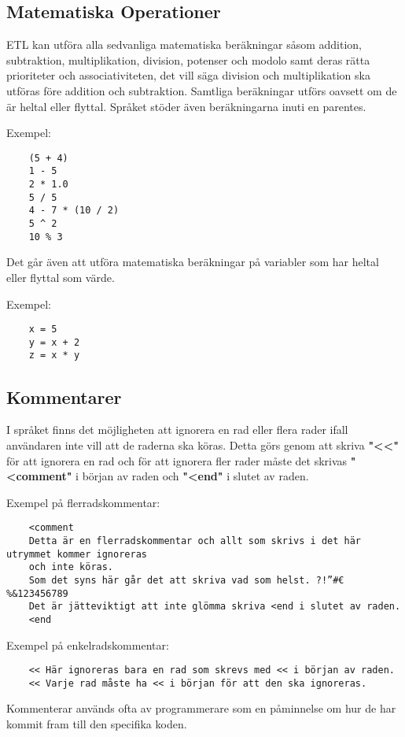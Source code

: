 \documentclass{TDP019mall}
\begin{document}
\subsection{Matematiska Operationer}
ETL kan utföra alla sedvanliga matematiska beräkningar såsom addition, subtraktion, multiplikation, division, potenser och modolo 
samt deras rätta prioriteter och associativiteten, det vill säga division och multiplikation ska utföras före addition och subtraktion. 
Samtliga beräkningar utförs oavsett om de är heltal eller flyttal. Språket stöder även beräkningarna inuti en parentes. 

Exempel:

\begin{verbatim}
    (5 + 4)
    1 - 5
    2 * 1.0
    5 / 5
    4 - 7 * (10 / 2)
    5 ^ 2
    10 % 3
\end{verbatim}

Det går även att utföra matematiska beräkningar på variabler som har heltal eller flyttal som värde. 

Exempel:
\begin{verbatim}
    x = 5
    y = x + 2
    z = x * y
\end{verbatim}

\subsection{Kommentarer}
I språket finns det möjligheten att ignorera en rad eller flera rader ifall användaren inte vill att de raderna ska köras. 
Detta görs genom att skriva \textbf{"<<"} för att ignorera en rad och för att ignorera fler rader måste det skrivas 
\textbf{"<comment"} i början av raden och \textbf{"<end"} i slutet av raden.

Exempel på flerradskommentar:
\begin{verbatim}
    <comment 
    Detta är en flerradskommentar och allt som skrivs i det här utrymmet kommer ignoreras 
    och inte köras. 
    Som det syns här går det att skriva vad som helst. ?!”#€%&123456789
    Det är jätteviktigt att inte glömma skriva <end i slutet av raden.
    <end
\end{verbatim}
 
Exempel på enkelradskommentar:
\begin{verbatim}
    << Här ignoreras bara en rad som skrevs med << i början av raden.
    << Varje rad måste ha << i början för att den ska ignoreras.
\end{verbatim}
 
Kommenterar används ofta av programmerare som en påminnelse om hur de har kommit fram till den specifika koden.
\end{document}
